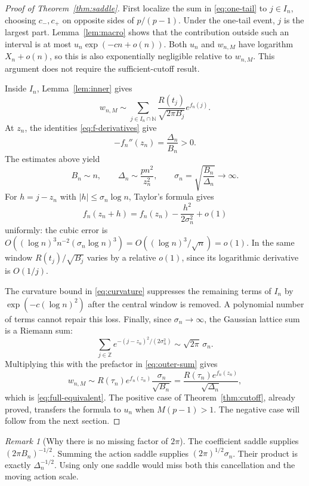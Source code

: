 \documentclass[11pt,a4paper]{article}
\numberwithin{equation}{section}
\theoremstyle{definition}
\theoremstyle{remark}
\newtheorem{remark}[theorem]{Remark}
\newcommand{\N}{\mathbb N}\newcommand{\R}{\mathbb R}\newcommand{\C}{\mathbb C}
\begin{document}
\begin{proof}[Proof of Theorem~\ref{thm:saddle}]
First localize the sum in \eqref{eq:one-tail} to $j\in I_n$, choosing
$c_-,c_+$ on opposite sides of $p/(p-1)$. Under the one-tail event,
$j$ is the largest part. Lemma~\ref{lem:macro} shows that the contribution
outside such an interval is at most
$u_n\exp(-cn+o(n))$. Both $u_n$ and $w_{n,M}$ have logarithm
$X_n+o(n)$, so this is also exponentially negligible relative to $w_{n,M}$.
This argument does not require the sufficient-cutoff result.

Inside $I_n$, Lemma~\ref{lem:inner} gives
\begin{equation}
 w_{n,M}\sim
 \sum_{j\in I_n\cap\N}
       \frac{R(t_j)}{\sqrt{2\pi B_j}}e^{f_n(j)}.
 \label{eq:outer-sum}
\end{equation}
At $z_n$, the identities \eqref{eq:f-derivatives} give
\[
 -f_n''(z_n)=\frac{\Delta_n}{B_n}>0.
\]
The estimates above yield
\begin{equation}
 B_n\sim n,\qquad
 \Delta_n\sim\frac{pn^2}{z_n^2},\qquad
 \sigma_n=\sqrt{\frac{B_n}{\Delta_n}}\longrightarrow\infty.
 \label{eq:BD-asymptotics}
\end{equation}
For $h=j-z_n$ with $|h|\le\sigma_n\log n$, Taylor's formula gives
\begin{equation}
 f_n(z_n+h)=f_n(z_n)-\frac{h^2}{2\sigma_n^2}+o(1)
 \label{eq:quadratic-window}
\end{equation}
uniformly: the cubic error is
$O((\log n)^3n^{-2}(\sigma_n\log n)^3)
=O((\log n)^3/\sqrt n)=o(1)$.
In the same window $R(t_j)/\sqrt{B_j}$ varies by a relative $o(1)$,
since its logarithmic derivative is $O(1/j)$.

The curvature bound in \eqref{eq:curvature} suppresses the remaining
terms of $I_n$ by $\exp(-c(\log n)^2)$ after the central window is
removed. A polynomial number of terms cannot repair this loss. Finally,
since $\sigma_n\to\infty$, the Gaussian lattice sum is a Riemann sum:
\[
 \sum_{j\in\mathbb Z}
 e^{-(j-z_n)^2/(2\sigma_n^2)}
 \sim\sqrt{2\pi}\,\sigma_n.
\]
Multiplying this with the prefactor in \eqref{eq:outer-sum} gives
\[
 w_{n,M}\sim
 R(\tau_n)e^{f_n(z_n)}\frac{\sigma_n}{\sqrt{B_n}}
 =\frac{R(\tau_n)e^{f_n(z_n)}}{\sqrt{\Delta_n}},
\]
which is \eqref{eq:full-equivalent}. The positive case of
Theorem~\ref{thm:cutoff}, already proved, transfers the formula to $u_n$
when $M(p-1)>1$. The negative case will follow from the next section.
\end{proof}

\begin{remark}[Why there is no missing factor of $2\pi$]
The coefficient saddle supplies $(2\pi B_n)^{-1/2}$. Summing the action
saddle supplies $(2\pi)^{1/2}\sigma_n$. Their product is exactly
$\Delta_n^{-1/2}$. Using only one saddle would miss both this cancellation
and the moving action scale.
\end{remark}
\end{document}
